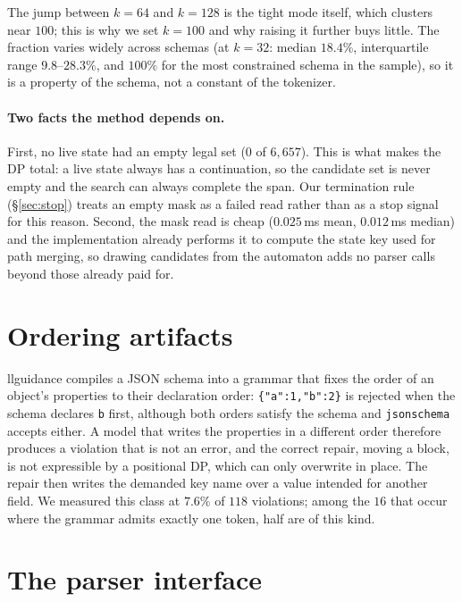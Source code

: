 \documentclass{article}
\begin{document}
The jump between $k{=}64$ and $k{=}128$ is the tight mode itself, which clusters
near $100$; this is why we set $k=100$ and why raising it further buys little.
The fraction varies widely across schemas (at $k{=}32$: median $18.4\%$,
interquartile range $9.8$--$28.3\%$, and $100\%$ for the most constrained schema
in the sample), so it is a property of the schema, not a constant of the
tokenizer.

\paragraph{Two facts the method depends on.}
First, no live state had an empty legal set ($0$ of $6{,}657$). This is what
makes the DP total: a live state always has a continuation, so the candidate set
is never empty and the search can always complete the span. Our termination rule
(\S\ref{sec:stop}) treats an empty mask as a failed read rather than as a stop
signal for this reason. Second, the mask read is cheap ($0.025$\,ms mean,
$0.012$\,ms median) and the implementation already performs it to compute the
state key used for path merging, so drawing candidates from the automaton adds
no parser calls beyond those already paid for.



\section{Ordering artifacts}
\label{app:ordering}

llguidance compiles a JSON schema into a grammar that fixes the order of an
object's properties to their declaration order: \texttt{\{"a":1,"b":2\}} is
rejected when the schema declares \texttt{b} first, although both orders satisfy
the schema and \texttt{jsonschema} accepts either. A model that writes the
properties in a different order therefore produces a violation that is not an
error, and the correct repair, moving a block, is not expressible by a
positional DP, which can only overwrite in place. The repair then writes the
demanded key name over a value intended for another field. We measured this class
at $7.6\%$ of $118$ violations; among the $16$ that occur where the grammar
admits exactly one token, half are of this kind.


\section{The parser interface}
\label{app:api}
\end{document}

